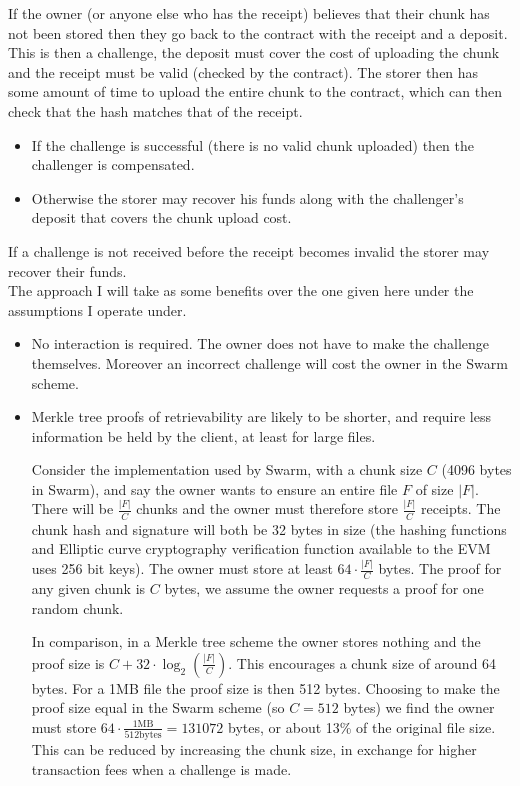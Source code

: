 \documentclass[10pt,twoside,a4paper]{article}
\begin{document}
If the owner (or anyone else who has the receipt) believes that their chunk has not been stored then they go back to the contract with the receipt and a deposit.
This is then a challenge, the deposit must cover the cost of uploading the chunk and the receipt must be valid (checked by the contract).
The storer then has some amount of time to upload the entire chunk to the contract, which can then check that the hash matches that of the receipt.

\begin{itemize}
\item If the challenge is successful (there is no valid chunk uploaded) then the challenger is compensated.
\item Otherwise the storer may recover his funds along with the challenger's deposit that covers the chunk upload cost.
\end{itemize}

If a challenge is not received before the receipt becomes invalid the storer may recover their funds.\\

The approach I will take as some benefits over the one given here under the assumptions I operate under.
\begin{itemize}
\item No interaction is required. The owner does not have to make the challenge themselves. Moreover an incorrect challenge will cost the owner in the Swarm scheme.
\item Merkle tree proofs of retrievability are likely to be shorter, and require less information be held by the client, at least for large files.

Consider the implementation used by Swarm, with a chunk size $C$ (4096 bytes in Swarm), and say the owner wants to ensure an entire file $F$ of size $|F|$.
There will be $\frac{|F|}{C}$ chunks and the owner must therefore store $\frac{|F|}{C}$ receipts.
The chunk hash and signature will both be 32 bytes in size (the hashing functions and Elliptic curve cryptography verification function available to the EVM uses 256 bit keys).
The owner must store at least $64 \cdot \frac{|F|}{C}$ bytes. The proof for any given chunk is $C$ bytes, we assume the owner requests a proof for one random chunk.

In comparison, in a Merkle tree scheme the owner stores nothing and the proof size is $C + 32 \cdot \log_2(\frac{|F|}{C})$.
This encourages a chunk size of around 64 bytes. For a 1MB file the proof size is then 512 bytes.
Choosing to make the proof size equal in the Swarm scheme (so $C = 512$ bytes) we find the owner must store $64 \cdot \frac{1 \text{MB}}{512 \text{bytes}} = 131072$ bytes,
or about 13\% of the original file size. This can be reduced by increasing the chunk size, in exchange for higher transaction fees when a challenge is made.
\end{itemize}
\end{document}
